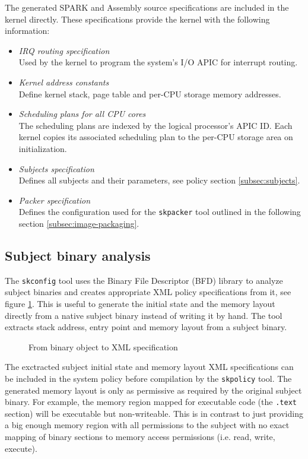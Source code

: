 The generated SPARK and Assembly source specifications are included in the
kernel directly. These specifications provide the kernel with the following
information:

\begin{itemize}
	\item \emph{IRQ routing specification}\\
		Used by the kernel to program the system's I/O APIC for interrupt
		routing.
	\item \emph{Kernel address constants}\\
		Define kernel stack, page table and per-CPU storage memory addresses.
	\item \emph{Scheduling plans for all CPU cores}\\
		The scheduling plans are indexed by the logical processor's APIC ID.
		Each kernel copies its associated scheduling plan to the per-CPU storage
		area on initialization.
	\item \emph{Subjects specification}\\
		Defines all subjects and their parameters, see policy section
		\ref{subsec:subjects}.
	\item \emph{Packer specification}\\
		Defines the configuration used for the \texttt{skpacker} tool outlined
		in the following section \ref{subsec:image-packaging}.
\end{itemize}

\subsection{Subject binary analysis}\label{subsec:subject-binary-analysis}
The \texttt{skconfig} tool uses the Binary File Descriptor (BFD)
library to analyze subject binaries and creates appropriate XML
policy specifications from it, see figure \ref{fig:object-analysis}. This is
useful to generate the initial state and the memory layout directly from a
native subject binary instead of writing it by hand. The tool extracts stack
address, entry point and memory layout from a subject binary.

\begin{figure}[h]
	\centering
	
	\caption{From binary object to XML specification}
	\label{fig:object-analysis}
\end{figure}

The exctracted subject initial state and memory layout XML specifications can be
included in the system policy before compilation by the \texttt{skpolicy} tool.
The generated memory layout is only as permissive as required by the original
subject binary. For example, the memory region mapped for executable code
(the \texttt{.text} section) will be executable but non-writeable. This is in
contrast to just providing a big enough memory region with all permissions to
the subject with no exact mapping of binary sections to memory access
permissions (i.e. read, write, execute).

